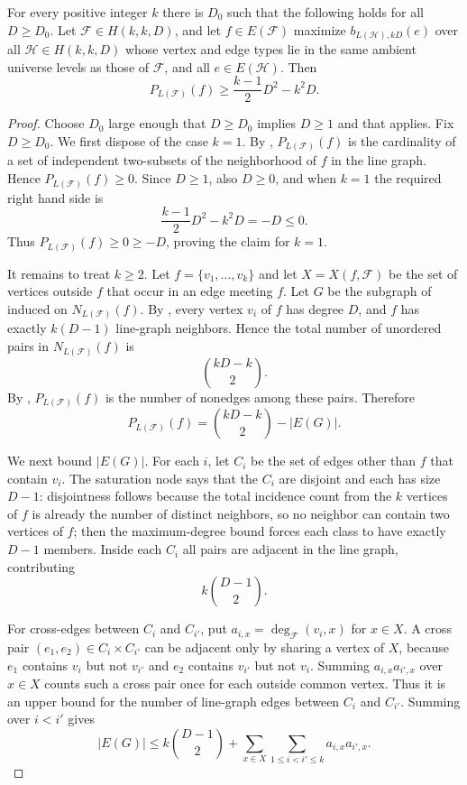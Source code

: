 \begin{lemma}
For every positive integer $k$ there is $D_0$ such that the following holds
for all $D\ge D_0$.  Let $\mathcal F\in H(k,k,D)$, and let
$f\in E(\mathcal F)$ maximize $b_{L(\mathcal H),kD}(e)$ over all
$\mathcal H\in H(k,k,D)$ whose vertex and edge types lie in the same
ambient universe levels as those of $\mathcal F$, and all
$e\in E(\mathcal H)$.  Then
\[
P_{L(\mathcal F)}(f)\ge \frac{k-1}{2}D^2-k^2D .
\]
\end{lemma}
\begin{proof}
Choose $D_0$ large enough that $D\ge D_0$ implies $D\ge 1$ and that
 applies.  Fix $D\ge D_0$.
We first dispose of the case $k=1$.  By ,
$P_{L(\mathcal F)}(f)$ is the cardinality of a set of independent
two-subsets of the neighborhood of $f$ in the line graph.  Hence
$P_{L(\mathcal F)}(f)\ge 0$.  Since $D\ge 1$, also $D\ge0$, and when
$k=1$ the required right hand side is
\[
\frac{k-1}{2}D^2-k^2D=-D\le 0 .
\]
Thus $P_{L(\mathcal F)}(f)\ge0\ge -D$, proving the claim for $k=1$.

It remains to treat $k\ge2$.
Let $f=\{v_1,\ldots,v_k\}$ and let $X=X(f,\mathcal F)$ be the set of
vertices outside $f$ that occur in an edge meeting $f$.  Let $G$ be the
subgraph of  induced on
$N_{L(\mathcal F)}(f)$.  By
, every vertex $v_i$ of $f$ has
degree $D$, and $f$ has exactly $k(D-1)$ line-graph neighbors.  Hence the
total number of unordered pairs in $N_{L(\mathcal F)}(f)$ is
\[
\binom{kD-k}{2}.
\]
By , $P_{L(\mathcal F)}(f)$ is the number of
nonedges among these pairs.  Therefore
\[
P_{L(\mathcal F)}(f)=\binom{kD-k}{2}-|E(G)|. \tag{1}
\]

We next bound $|E(G)|$.  For each $i$, let
$C_i$ be the set of edges other than $f$ that contain $v_i$.  The saturation
node says that the $C_i$ are disjoint and each has size $D-1$: disjointness
follows because the total incidence count from the $k$ vertices of $f$ is
already the number of distinct neighbors, so no neighbor can contain two
vertices of $f$; then the maximum-degree bound forces each class to have
exactly $D-1$ members.  Inside each $C_i$ all pairs are adjacent in the line
graph, contributing
\[
k\binom{D-1}{2}. \tag{2}
\]

For cross-edges between $C_i$ and $C_{i'}$, put
$a_{i,x}=\deg_{\mathcal F}(v_i,x)$ for $x\in X$.  A cross pair
$(e_1,e_2)\in C_i\times C_{i'}$ can be adjacent only by sharing a vertex of
$X$, because $e_1$ contains $v_i$ but not $v_{i'}$ and $e_2$ contains
$v_{i'}$ but not $v_i$.  Summing
$a_{i,x}a_{i',x}$ over $x\in X$ counts such a cross pair once for each
outside common vertex.  Thus it is an upper bound for the number of
line-graph edges between $C_i$ and $C_{i'}$.  Summing over $i<i'$ gives
\[
|E(G)|\le
k\binom{D-1}{2}
+
\sum_{x\in X}\sum_{1\le i<i'\le k}a_{i,x}a_{i',x}. \tag{3}
\]


\end{proof}

